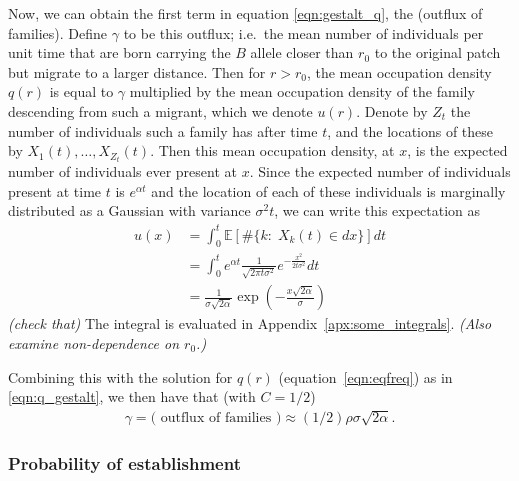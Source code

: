 \documentclass{article}
\newcommand{\E}{\mathbb{E}}
\newcommand{\plr}[1]{{\it\color{blue}(#1)}}
\begin{document}
Now, we can obtain the first term in equation \eqref{eqn:gestalt_q}, the (outflux of families).
Define $\gamma$ to be this outflux; 
i.e.\ the mean number of individuals per unit time that are born carrying the $B$ allele closer than $r_0$ to the original patch
but migrate to a larger distance.
Then for $r>r_0$, the mean occupation density $q(r)$ is equal to $\gamma$ 
multiplied by the mean occupation density of the family descending from such a migrant,
which we denote $u(r)$.
Denote by $Z_t$ the number of individuals such a family has after time $t$,
and the locations of these by $X_1(t), \ldots, X_{Z_t}(t)$.
Then this mean occupation density, at $x$, is the expected number of individuals ever present at $x$. 
Since the expected number of individuals present at time $t$ is $e^{\alpha t}$
and the location of each of these individuals is marginally distributed as a  Gaussian with variance $\sigma^2 t$,
we can write this expectation as
\begin{align}
    u(x) &= \int_0^t \E[ \#\{ k : \; X_k(t) \in dx \} ] dt \\
    &= \int_0^t e^{\alpha t} \frac{1}{\sqrt{2 \pi t \sigma^2}} e^{-\frac{x^2}{2t\sigma^2}} dt \\
    &= \frac{ 1 }{ \sigma \sqrt{2 \alpha} } \exp\left( - \frac{ x \sqrt{2\alpha} }{ \sigma } \right) 
\end{align}
\plr{check that}
The integral is evaluated in Appendix~\ref{apx:some_integrals}.
\plr{Also examine non-dependence on $r_0$.}

Combining this with the solution for $q(r)$ (equation~\eqref{eqn:eqfreq}) as in \eqref{eqn:q_gestalt},
we then have that (with $C=1/2$)
\begin{align} \label{eqn:outflux}
    \gamma = \text{( outflux of families )} \approx (1/2) \rho \sigma \sqrt{2\alpha} .
\end{align}

\subsubsection*{Probability of establishment}
\end{document}
